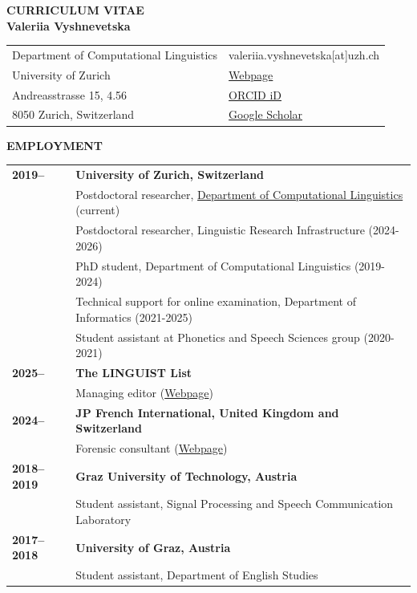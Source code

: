 \documentclass[11pt]{article}
\begin{document}
\begin{center}
{\bf CURRICULUM VITAE\\Valeriia Vyshnevetska}\\
\vskip 12pt






\begin{tabular}{ll}
Department of Computational Linguistics & valeriia.vyshnevetska[at]uzh.ch \\
University of Zurich & \href{https://www.cl.uzh.ch/de/about-us/people/team/phonetics/Valeriia-Vyshnevetska.html}{Webpage} \\ 
Andreasstrasse 15, 4.56 & \href{https://orcid.org/0009-0003-3355-9580}{ORCID iD} \\
8050 Zurich, Switzerland & \href{https://scholar.google.com/citations?user=9IiY_w8AAAAJ&hl=ru}{Google Scholar} \\
\end{tabular}
\end{center}





\vskip 12pt
\begin{flushleft}
{\bf EMPLOYMENT}
\end{flushleft}
\begin{tabular}{lp{5.5in}}
\bf 2019-- & {\bf University of Zurich, Switzerland} \\
& Postdoctoral researcher, \href{https://www.cl.uzh.ch/en.html}{Department of Computational Linguistics} (current) \\
& Postdoctoral researcher, Linguistic Research Infrastructure (2024-2026) \\
& PhD student, Department of Computational Linguistics (2019-2024) \\
& Technical support for online examination, Department of Informatics (2021-2025) \\
& Student assistant at Phonetics and Speech Sciences group (2020-2021) \\
\bf 2025-- & {\bf The LINGUIST List} \\
& Managing editor (\href{https://linguistlist.org/}{Webpage}) \\
\bf 2024-- & {\bf JP French International, United Kingdom and Switzerland} \\
& Forensic consultant (\href{https://www.jpfrench.com/valeriia-vyshnevetska/}{Webpage}) \\
\bf 2018--2019 & {\bf Graz University of Technology, Austria} \\
& Student assistant, Signal Processing and Speech Communication Laboratory \\
\bf 2017--2018 & {\bf University of Graz, Austria} \\
& Student assistant, Department of English Studies \\
\end{tabular}
\end{document}
